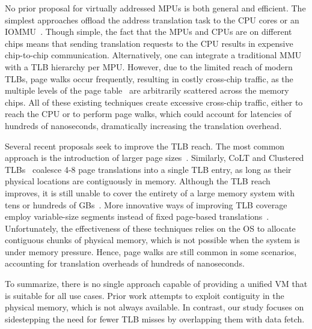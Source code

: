 
No prior proposal for virtually addressed MPUs is both general and efficient. The simplest approaches offload the address translation task to the CPU cores or an IOMMU~\cite{oskin:active, vesely:observation, gao:practical, xi:beyond}. Though simple, the fact that the MPUs and CPUs are on different chips means that sending translation requests to the CPU results in expensive chip-to-chip communication. Alternatively, one can integrate a traditional MMU with a TLB hierarchy per MPU. However, due to the limited reach of modern TLBs, page walks occur frequently, resulting in costly cross-chip traffic, as the multiple levels of the page table~\cite{gantz:hybrid} are arbitrarily scattered across the memory chips. All of these existing techniques create excessive cross-chip traffic, either to reach the CPU or to perform page walks, which could account for latencies of hundreds of nanoseconds, dramatically increasing the translation overhead.

Several recent proposals seek to improve the TLB reach. The most common approach is the introduction of larger page sizes~\cite{transparenthugepages, lighugetlbfs}. Similarly, CoLT\cite{pham:colt} and Clustered TLBs~\cite{pham:increasing} coalesce 4-8 page translations into a single TLB entry, as long as their physical locations are contiguously in memory. Although the TLB reach improves, it is still unable to cover the entirety of a large memory system with tens or hundreds of GBs~\cite{gandhi:range}. More innovative ways of improving TLB coverage employ variable-size segments instead of fixed page-based translations~\cite{karakostas:redundant, park:hybrid, basu:efficient}. Unfortunately, the effectiveness of these techniques relies on the OS to allocate contiguous chunks of physical memory, which is not possible when the system is under memory pressure. Hence, page walks are still common in some scenarios, accounting for translation overheads of hundreds of nanoseconds. 

To summarize, there is no single approach capable of providing a unified VM that is suitable for all use cases. Prior work attempts to exploit contiguity in the physical memory, which is not always available. In contrast, our study focuses on sidestepping the need for fewer TLB misses by overlapping them with data fetch.






